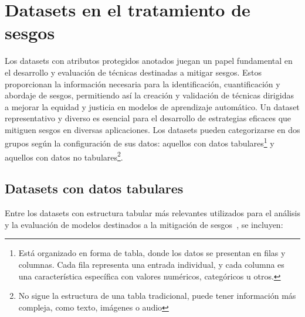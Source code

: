 \section{Datasets en el tratamiento de sesgos}

    Los datasets con atributos protegidos anotados juegan un papel fundamental en el desarrollo y evaluaci\'on de t\'ecnicas destinadas 
    a mitigar sesgos. Estos proporcionan la informaci\'on necesaria para la identificaci\'on, cuantificaci\'on y abordaje de sesgos, 
    permitiendo as\'i la creaci\'on y validaci\'on de t\'ecnicas dirigidas a mejorar la equidad y justicia en modelos de aprendizaje 
    autom\'atico. 
    Un dataset representativo y diverso es esencial para el desarrollo de estrategias eficaces que mitiguen sesgos en diversas aplicaciones. 
    Los datasets pueden categorizarse en dos grupos seg\'un la configuraci\'on de sus datos: 
    aquellos con datos tabulares\footnote{Est\'a organizado en forma de tabla, donde los datos se presentan en filas y columnas. Cada fila 
    representa una entrada individual, y cada columna es una caracter\'istica espec\'ifica con valores num\'ericos, categ\'oricos u otros.} 
    y aquellos con datos no tabulares\footnote{No sigue la estructura de una tabla tradicional, puede tener informaci\'on m\'as compleja, como 
    texto, im\'agenes o audio}.
    
    \subsection{Datasets con datos tabulares}
    Entre los datasets con estructura tabular m\'as relevantes utilizados para el an\'alisis y la evaluaci\'on de modelos destinados 
    a la mitigaci\'on de sesgos~\parencite{calmon2017optimized,wang2023mitigating,compas}, se incluyen:

